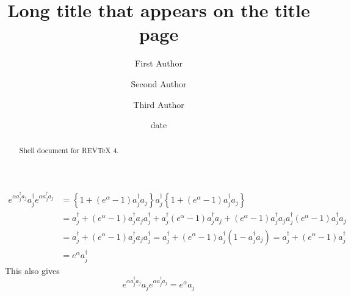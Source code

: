 \documentclass[aps,preprint]{revtex4}%
\begin{document}
\title[Short title for running header]{Long title that appears on the title page}
\author{First Author}
\author{Second Author}
\author{Third Author}

\begin{abstract}
Shell document for REV\TeX{} 4.

\end{abstract}
\date[Date text]{date}




\maketitle
\tableofcontents
%

\begin{align}
e^{\alpha a_{j}^{\dagger}a_{j}}a_{j}^{\dagger}e^{\alpha a_{j}^{\dagger}a_{j}}
& =\left\{  1+\left(  e^{\alpha}-1\right)  a_{j}^{\dagger}a_{j}\right\}
a_{j}^{\dagger}\left\{  1+\left(  e^{\alpha}-1\right)  a_{j}^{\dagger}%
a_{j}\right\}  \\
& =a_{j}^{\dagger}+\left(  e^{\alpha}-1\right)  a_{j}^{\dagger}a_{j}%
a_{j}^{\dagger}+a_{j}^{\dagger}\left(  e^{\alpha}-1\right)  a_{j}^{\dagger
}a_{j}+\left(  e^{\alpha}-1\right)  a_{j}^{\dagger}a_{j}a_{j}^{\dagger}\left(
e^{\alpha}-1\right)  a_{j}^{\dagger}a_{j}\\
& =a_{j}^{\dagger}+\left(  e^{\alpha}-1\right)  a_{j}^{\dagger}a_{j}%
a_{j}^{\dagger}=a_{j}^{\dagger}+\left(  e^{\alpha}-1\right)  a_{j}^{\dagger
}\left(  1-a_{j}^{\dagger}a_{j}\right)  =a_{j}^{\dagger}+\left(  e^{\alpha
}-1\right)  a_{j}^{\dagger}\\
& =e^{\alpha}a_{j}^{\dagger}%
\end{align}
This also gives
\begin{equation}
e^{\alpha a_{j}^{\dagger}a_{j}}a_{j}e^{\alpha a_{j}^{\dagger}a_{j}}=e^{\alpha
}a_{j}%
\end{equation}
%
\end{document}
